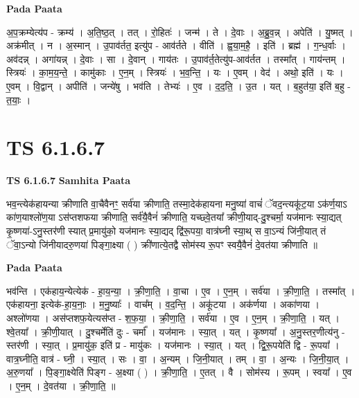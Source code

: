 \documentclass[17pt]{extarticle}
\begin{document}
\textbf{Pada Paata} \newline

अ॒प॒क्रम्येत्य॑प - क्रम्य॑ । अ॒ति॒ष्ठ॒त् । तत् । रो॒हितः॑ । जन्म॑ । ते । दे॒वाः । अ॒ब्रु॒व॒न्न् । अपेति॑ । यु॒ष्मत् । अक्र॑मीत् । न । अ॒स्मान् । उ॒पाव॑र्तत॒ इत्यु॑प - आव॑र्तते । वीति॑ । ह्व॒या॒म॒है॒ । इति॑ । ब्रह्म॑ । ग॒न्ध॒र्वाः । अव॑दन्न् । अगा॑यन्न् । दे॒वाः । सा । दे॒वान् । गाय॑तः । उ॒पाव॑र्त॒तेत्यु॑प-आव॑र्तत । तस्मा᳚त् । गाय॑न्तम् । स्त्रियः॑ । का॒म॒य॒न्ते॒ । कामु॑काः । ए॒न॒म् । स्त्रियः॑ । भ॒व॒न्ति॒ । यः । ए॒वम् । वेद॑ । अथो॒ इति॑ । यः । ए॒वम् । वि॒द्वान् । अपीति॑ । जन्ये॑षु । भव॑ति । तेभ्यः॑ । ए॒व । द॒द॒ति॒ । उ॒त । यत् । ब॒हुत॑या॒ इति॑ ब॒हु - त॒याः॒ ।  \newline





\section{ TS 6.1.6.7 }

\textbf{TS 6.1.6.7 } \newline
\textbf{Samhita Paata} \newline

भव॒न्त्येक॑हायन्या क्रीणाति वा॒चैवैनꣳ॒॒ सर्व॑या क्रीणाति॒ तस्मा॒देक॑हायना मनु॒ष्या॑ वाचं॑ ॅवद॒न्त्यकू॑ट॒या ऽक॑र्ण॒याऽ का॑ण॒याश्लो॑ण॒या ऽस॑प्तशफया क्रीणाति॒ सर्व॑यै॒वैनं॑ क्रीणाति॒ यच्छ्वे॒तया᳚ क्रीणी॒याद्-दु॒श्चर्मा॒ यज॑मानः स्या॒द्यत् कृ॒ष्णया॑-ऽनु॒स्तर॑णी स्यात् प्र॒मायु॑को॒ यज॑मानः स्या॒द्यद् द्वि॑रू॒पया॒ वात्र॑घ्नी स्या॒थ् स वा॒ऽन्यं जि॑नी॒यात् तं ॅवा॒ऽन्यो जि॑नीयादरु॒णया॑ पिङ्गा॒क्ष्या ( ) क्री॑णात्ये॒तद्वै सोम॑स्य रू॒पꣳ स्वयै॒वैनं॑ दे॒वत॑या क्रीणाति ॥ \newline

\textbf{Pada Paata} \newline

भव॑न्ति । एक॑हाय॒न्येत्येक॑ - हा॒य॒न्या॒ । क्री॒णा॒ति॒ । वा॒चा । ए॒व । ए॒न॒म् । सर्व॑या । क्री॒णा॒ति॒ । तस्मा᳚त् । एक॑हायना॒ इत्येक॑-हा॒य॒नाः॒ । म॒नु॒ष्याः᳚ । वाच᳚म् । व॒द॒न्ति॒ । अकू॑टया । अक॑र्णया । अका॑णया । अश्लो॑णया । अस॑प्तशफ॒येत्यस॑प्त - श॒फ॒या॒ । क्री॒णा॒ति॒ । सर्व॑या । ए॒व । ए॒न॒म् । क्री॒णा॒ति॒ । यत् । श्वे॒तया᳚ । क्री॒णी॒यात् । दु॒श्चर्मेति॑ दुः - चर्मा᳚ । यज॑मानः । स्या॒त् । यत् । कृ॒ष्णया᳚ । अ॒नु॒स्तर॒णीत्य॑नु - स्तर॑णी । स्या॒त् । प्र॒मायु॑क॒ इति॑ प्र - मायु॑कः । यज॑मानः । स्या॒त् । यत् । द्वि॒रू॒पयेति॑ द्वि - रू॒पया᳚ । वात्र॒घ्नीति॒ वात्र॑ - घ्नी॒ । स्या॒त् । सः । वा॒ । अ॒न्यम् । जि॒नी॒यात् । तम् । वा॒ । अ॒न्यः । जि॒नी॒या॒त् । अ॒रु॒णया᳚ । पि॒ङ्गा॒क्ष्येति॑ पिङ्ग - अ॒क्ष्या ( ) । क्री॒णा॒ति॒ । ए॒तत् । वै । सोम॑स्य । रू॒पम् । स्वया᳚ । ए॒व । ए॒न॒म् । दे॒वत॑या । क्री॒णा॒ति॒ ॥  \newline
\end{document}
